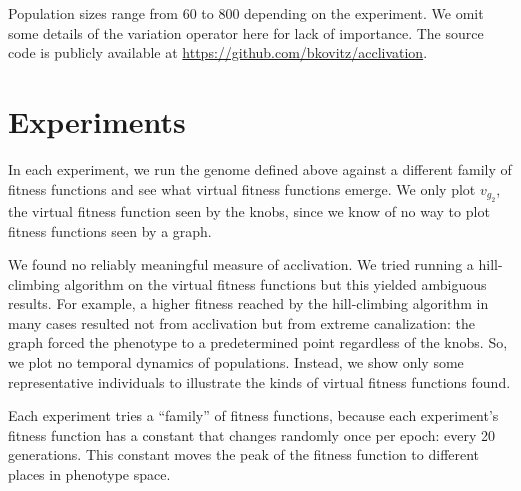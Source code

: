 \documentclass[letterpaper]{article}
\begin{document}
Population sizes range from 60 to 800 depending on the experiment. We omit some
details of the variation operator here for lack of importance. The source code
is publicly available at
\href{https://github.com/bkovitz/acclivation}{https://github.com/bkovitz/acclivation}.

\section{Experiments}

In each experiment, we run the genome defined above against a different family
of fitness functions and see what virtual fitness functions emerge. We only
plot $v_{g_2}$, the virtual fitness function seen by the knobs, since we know
of no way to plot fitness functions seen by a graph.

We found no reliably meaningful measure of acclivation. We tried running a
hill-climbing algorithm on the virtual fitness functions but this yielded
ambiguous results. For example, a higher fitness reached by the hill-climbing
algorithm in many cases resulted not from acclivation but from extreme
canalization: the graph forced the phenotype to a predetermined point
regardless of the knobs. So, we plot no temporal dynamics of populations.
Instead, we show only some representative individuals to illustrate the kinds
of virtual fitness functions found.

Each experiment tries a ``family'' of fitness functions, because each
experiment's fitness function has a constant that changes randomly once per
epoch: every 20 generations. This constant moves the peak of the fitness
function to different places in phenotype space.

\end{document}
